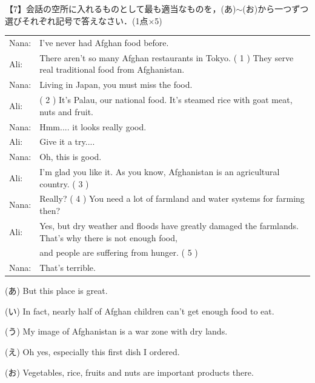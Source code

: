 \noindent 【7】会話の空所に入れるものとして最も適当なものを，(あ)$\sim$(お)から一つずつ選びそれぞれ記号で答えなさい．(1点$\times$5)\medskip\\
\begin{tabular}{l l}
  Nana:& I've never had Afghan food before.\\
  Ali:& There aren't so many Afghan restaurants in Tokyo. ( 1 ) They serve real traditional food from Afghanistan. \\
  Nana:& Living in Japan, you must miss the food.\\
  Ali:& ( 2 ) It's Palau, our national food. It's steamed rice with goat meat, nuts and fruit. \\
  Nana:& Hmm.... it looks really good.\\
  Ali:& Give it a try....\\
  Nana:& Oh, this is good.\\
  Ali:& I'm glad you like it. As you know, Afghanistan is an agricultural country. ( 3 ) \\
  Nana:& Really? ( 4 ) You need a lot of farmland and water systems for farming then? \\
  Ali:& Yes, but dry weather and floods have greatly damaged the farmlands. That's why there is not enough food,\\
  &and people are suffering from hunger. ( 5 )\\ 
  Nana:& That's terrible.\\
\end{tabular}
\bigskip\par
(あ) But this place is great.\par
(い) In fact, nearly half of Afghan children can't get enough food to eat.\par
(う) My image of Afghanistan is a war zone with dry lands.\par
(え) Oh yes, especially this first dish I ordered.\par
(お) Vegetables, rice, fruits and nuts are important products there. \\

